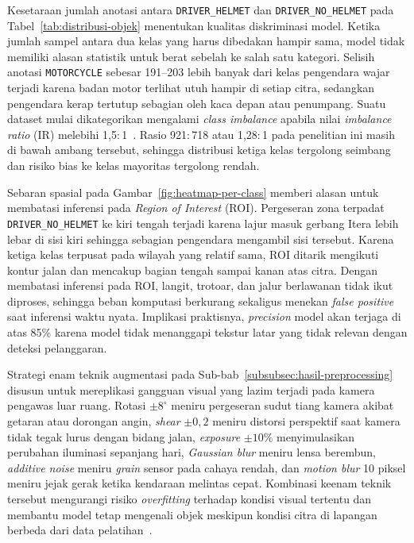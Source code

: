 Kesetaraan jumlah anotasi antara \texttt{DRIVER\_HELMET} dan \texttt{DRIVER\_NO\_HELMET} pada Tabel~\ref{tab:distribusi-objek} menentukan kualitas diskriminasi model. Ketika jumlah sampel antara dua kelas yang harus dibedakan hampir sama, model tidak memiliki alasan statistik untuk berat sebelah ke salah satu kategori. Selisih anotasi \texttt{MOTORCYCLE} sebesar 191--203 lebih banyak dari kelas pengendara wajar terjadi karena badan motor terlihat utuh hampir di setiap citra, sedangkan pengendara kerap tertutup sebagian oleh kaca depan atau penumpang. Suatu dataset mulai dikategorikan mengalami \textit{class imbalance} apabila nilai \textit{imbalance ratio} (IR) melebihi 1,5$:$1~\cite{kraiem2021resampling}. Rasio 921$:$718 atau 1,28$:$1 pada penelitian ini masih di bawah ambang tersebut, sehingga distribusi ketiga kelas tergolong seimbang dan risiko bias ke kelas mayoritas tergolong rendah.

Sebaran spasial pada Gambar~\ref{fig:heatmap-per-class} memberi alasan untuk membatasi inferensi pada \textit{Region of Interest} (ROI). Pergeseran zona terpadat \texttt{DRIVER\_NO\_HELMET} ke kiri tengah terjadi karena lajur masuk gerbang Itera lebih lebar di sisi kiri sehingga sebagian pengendara mengambil sisi tersebut. Karena ketiga kelas terpusat pada wilayah yang relatif sama, ROI ditarik mengikuti kontur jalan dan mencakup bagian tengah sampai kanan atas citra. Dengan membatasi inferensi pada ROI, langit, trotoar, dan jalur berlawanan tidak ikut diproses, sehingga beban komputasi berkurang sekaligus menekan \textit{false positive} saat inferensi waktu nyata. Implikasi praktisnya, \textit{precision} model akan terjaga di atas 85\% karena model tidak menanggapi tekstur latar yang tidak relevan dengan deteksi pelanggaran.

Strategi enam teknik augmentasi pada Sub-bab~\ref{subsubsec:hasil-preprocessing} disusun untuk mereplikasi gangguan visual yang lazim terjadi pada kamera pengawas luar ruang. Rotasi $\pm 8^\circ$ meniru pergeseran sudut tiang kamera akibat getaran atau dorongan angin, \textit{shear} $\pm 0{,}2$ meniru distorsi perspektif saat kamera tidak tegak lurus dengan bidang jalan, \textit{exposure} $\pm 10\%$ menyimulasikan perubahan iluminasi sepanjang hari, \textit{Gaussian blur} meniru lensa berembun, \textit{additive noise} meniru \textit{grain} sensor pada cahaya rendah, dan \textit{motion blur} 10 piksel meniru jejak gerak ketika kendaraan melintas cepat. Kombinasi keenam teknik tersebut mengurangi risiko \textit{overfitting} terhadap kondisi visual tertentu dan membantu model tetap mengenali objek meskipun kondisi citra di lapangan berbeda dari data pelatihan~\cite{shorten2019survey}.

